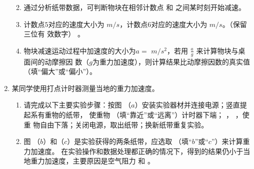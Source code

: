 \begin{enumerate}
\begin{enumerate}
\renewcommand{\labelenumi}{\arabic{enumi}.}
\item
通过分析纸带数据，可判断物块在相邻计数点
和
之间某时刻开始减速。


\item 
计数点$ 5 $对应的速度大小为
$ m/s $，计数点$ 6 $对应的速度大小为
$ m/s $。（保留三位有
效数字）
。


\item 
物块减速运动过程中加速度的大小为$ a= $
$ m/s^{2} $，若用
$ \frac{a}{g} $
来计算物块与桌面间的动摩擦因
数（$ g $为重力加速度），则计算结果比动摩擦因数的真实值
（填“偏大”或“偏小”）。





\end{enumerate}


\item 
{}
某同学使用打点计时器测量当地的重力加速度。
\begin{enumerate}
\renewcommand{\labelenumi}{\arabic{enumi}.}
\item
请完成以下主要实验步骤：按图 （$ a $）安装实验器材并连接电源；竖直提起系有重物的纸带，
使重物
（填“靠近”或“远离”）计时器下端；
，
，使重
物自由下落；关闭电源，取出纸带；换新纸带重复实验。

\item 
图 （$ b $）和（$ c $）是实验获得的两条纸带，应选取
（填“$ b $”或“$ c $”）来计算重力加速度。
在实验操作和数据处理都正确的情况下，得到的结果仍小于当地重力加速度，主要原因是空气阻力
和
。



\end{enumerate}
\begin{figure}[h!]
\centering

\end{figure}






\end{enumerate}
